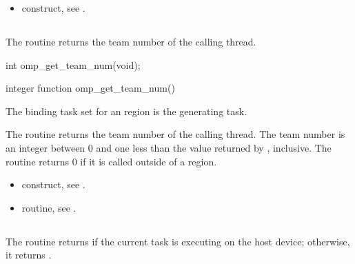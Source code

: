 \crossreferences
\begin{itemize}
\item {} construct, see 
. 
\end{itemize}










\pagebreak
\subsection{}
\label{subsec:omp_get_team_num}
\summary
The  routine returns the team number of the calling thread.

\format
\ccppspecificstart
\begin{boxedcode}
int omp\_get\_team\_num(void);
\end{boxedcode}
\ccppspecificend

\fortranspecificstart
\begin{boxedcode}
integer function omp\_get\_team\_num()
\end{boxedcode}
\fortranspecificend

\binding
The binding task set for an  region is the generating task.

\effect
The  routine returns the team number of the calling thread. The 
team number is an integer between 0 and one less than the value returned by 
, inclusive. The routine returns 0 if it is called outside of a 
 region.

\crossreferences
\begin{itemize}
\item {} construct, see 
.

\item {} routine, see 
. 
\end{itemize}









\subsection{}
\label{subsec:omp_is_initial_device}
\summary
The  routine returns  if the current task is executing 
on the host device; otherwise, it returns .

